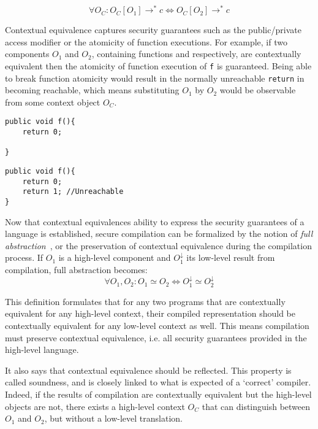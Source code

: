 \documentclass[11pt]{article}
\newcommand{\com}[1]{#1^\downarrow}
\begin{document}
\[
 \forall O_C : O_C[O_1] \rightarrow^* c \iff O_C[O_2] \rightarrow^* c
\]

Contextual equivalence captures security guarantees such as the public/private access modifier or the atomicity of function executions. For example, if two components $O_1$ and $O_2$, containing functions  and  respectively, are contextually equivalent then the atomicity of function execution of \lstinline{f} is guaranteed. Being able to break function atomicity would result in the normally unreachable \lstinline{return} in  becoming reachable, which means substituting $O_1$ by $O_2$ would be observable from some context object $O_C$.

\begin{minipage}{0.40\textwidth}
\begin{lstlisting}[label={lst:SimpleReturn}, caption={Simple return}]
public void f(){
    return 0;
    
}
\end{lstlisting}
\end{minipage}
\begin{minipage}{0.40\textwidth}
\begin{lstlisting}[label={lst:UnreachableCode}, caption={Unreachable code}]
public void f(){
    return 0; 
    return 1; //Unreachable
}
\end{lstlisting}
\end{minipage}

Now that contextual equivalences ability to express the security guarantees of a language is established, secure compilation can be formalized by the notion of \emph{full abstraction}~\cite{Abadi}, or the preservation of contextual equivalence during the compilation process.
If $O_1$ is a high-level component and $\com{O_1}$ its low-level result from compilation, full abstraction becomes:
\[
 \forall O_1, O_2 : O_1 \simeq O_2 \iff \com{O_1} \simeq \com{O_2}
\]

This definition formulates that for any two programs that are contextually equivalent for any high-level context, their compiled representation should be contextually equivalent for any low-level context as well. 
This means compilation must preserve contextual equivalence, i.e. all security guarantees provided in the high-level language.

It also says that contextual equivalence should be reflected.
This property is called soundness, and is closely linked to what is expected of a `correct' compiler.
Indeed, if the results of compilation are contextually equivalent but the high-level objects are not, there exists a high-level context $O_C$ that can distinguish between $O_1$ and $O_2$, but without a low-level translation.
\end{document}
